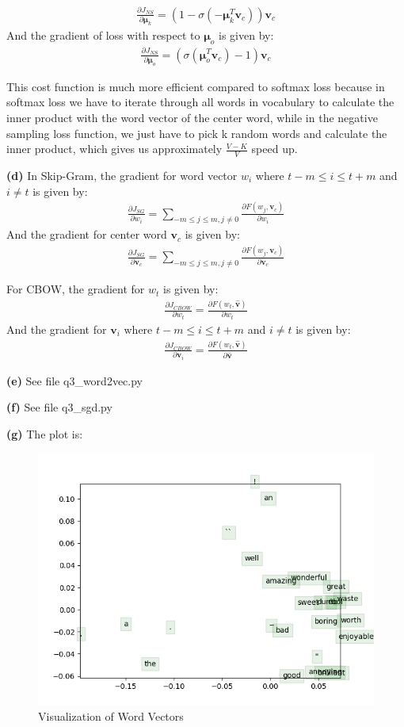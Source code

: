 \documentclass[10pt, a4paper]{ctexart}
\begin{document}
\begin{align*}
    \frac{\partial J_{NS}}{\partial {\bm \mu}_k}=(1-\sigma(-{\bm \mu}_k^T{\bm v}_c)){\bm v}_c
\end{align*}
And the gradient of loss with respect to ${\bm \mu}_o$ is given by:
\begin{align*}
    \frac{\partial J_{NS}}{\partial {\bm \mu}_o}=(\sigma({\bm \mu}_o^T{\bm v}_c)-1){\bm v}_c
\end{align*}\par
This cost function is much more efficient compared to softmax loss because in softmax loss we have to iterate through all words in vocabulary to calculate the inner product with the word vector of the center word, while in the negative sampling loss function, we just have to pick k random words and calculate the inner product, which gives us approximately $\frac{V-K}{V}$ speed up.\par
{\bf{(d)}} In Skip-Gram, the gradient for word vector $w_{i}$ where $t-m \le i \le t+m$ and $i\ne t$ is given by:
\begin{align*}
    \frac{\partial J_{SG}}{\partial w_i}=\sum_{-m\le j\le m,j\ne 0}\frac{\partial F(w_j, {\bm v}_c)}{\partial w_i}
\end{align*}
And the gradient for center word ${\bm v}_c$ is given by:
\begin{align*}
    \frac{\partial J_{SG}}{\partial {\bm v}_c}=\sum_{-m\le j\le m,j\ne 0}\frac{\partial F(w_j,{\bm v}_c)}{\partial {\bm v}_c}
\end{align*}\par
For CBOW, the gradient for $w_t$ is given by:
\begin{align*}
    \frac{\partial J_{CBOW}}{\partial w_t}=\frac{\partial F(w_t, {\bm{\hat{v}}})}{\partial w_t}
\end{align*}
And the gradient for ${\bm v}_i$ where $t-m\le i\le t+m$ and $i\ne t$ is given by:
\begin{align*}
    \frac{\partial J_{CBOW}}{\partial {\bm v}_i}=\frac{\partial F(w_t, {\bm{\hat v}})}{\partial {\bm{\hat v}}}
\end{align*}\par
{\bf{(e)}} See file q3\_word2vec.py\par
{\bf{(f)}} See file q3\_sgd.py\par
{\bf{(g)}} The plot is:
\begin{figure}[H]
    \centering
    \includegraphics[width=0.7\linewidth]{../q3_word_vectors.png}
    \caption{Visualization of Word Vectors}
\end{figure}\par
\end{document}
